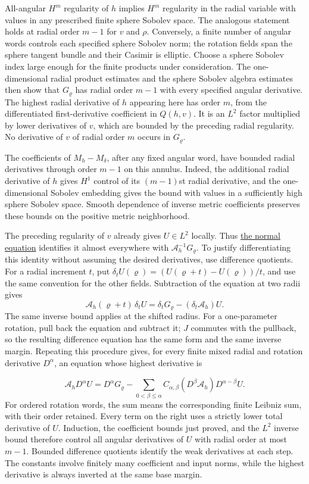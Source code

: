 \documentclass[
  english,
  11pt,
  reqno]{amsart}
\begin{document}
All-angular \(H^m\) regularity of \(h\) implies \(H^m\) regularity in
the radial variable with values in any prescribed finite sphere Sobolev
space. The analogous statement holds at radial order \(m-1\) for \(v\)
and \(\rho\). Conversely, a finite number of angular words controls each
specified sphere Sobolev norm; the rotation fields span the sphere
tangent bundle and their Casimir is elliptic. Choose a sphere Sobolev
index large enough for the finite products under consideration. The
one-dimensional radial product estimates and the sphere Sobolev algebra
estimates then show that \(G_\varrho\) has radial order \(m-1\) with
every specified angular derivative. The highest radial derivative of
\(h\) appearing here has order \(m\), from the differentiated
first-derivative coefficient in \(Q(h,v)\). It is an \(L^2\) factor
multiplied by lower derivatives of \(v\), which are bounded by the
preceding radial regularity. No derivative of \(v\) of radial order
\(m\) occurs in \(G_\varrho\).

The coefficients of \(M_h-M_\delta\), after any fixed angular word, have
bounded radial derivatives through order \(m-1\) on this annulus.
Indeed, the additional radial derivative of \(h\) gives \(H^1\) control
of its \((m-1)\)st radial derivative, and the one-dimensional Sobolev
embedding gives the bound with values in a sufficiently high sphere
Sobolev space. Smooth dependence of inverse metric coefficients
preserves these bounds on the positive metric neighborhood.

The preceding regularity of \(v\) already gives \(U\in L^2\) locally.
Thus \hyperref[eq:online-momentum-invertible-normal-equation]{the normal
equation} identifies it almost everywhere with
\(\mathcal A_h^{-1}G_\varrho\). To justify differentiating this identity
without assuming the desired derivatives, use difference quotients. For
a radial increment \(t\), put
\(\delta_tU(\varrho)=(U(\varrho+t)-U(\varrho))/t\), and use the same
convention for the other fields. Subtraction of the equation at two
radii gives \[
\mathcal A_h(\varrho+t)\,\delta_tU
 =\delta_tG_\varrho-(\delta_t\mathcal A_h)U.
\] The same inverse bound applies at the shifted radius. For a
one-parameter rotation, pull back the equation and subtract it; \(J\)
commutes with the pullback, so the resulting difference equation has the
same form and the same inverse margin. Repeating this procedure gives,
for every finite mixed radial and rotation derivative \(D^\alpha\), an
equation whose highest derivative is

\label{eq:online-momentum-differentiated-normal-equation}
\[
\mathcal A_hD^\alpha U
 =D^\alpha G_\varrho
  -\sum_{0<\beta\le\alpha}
     C_{\alpha,\beta}
       (D^\beta\mathcal A_h)D^{\alpha-\beta}U.
\] For ordered rotation words, the sum means the corresponding finite
Leibniz sum, with their order retained. Every term on the right uses a
strictly lower total derivative of \(U\). Induction, the coefficient
bounds just proved, and the \(L^2\) inverse bound therefore control all
angular derivatives of \(U\) with radial order at most \(m-1\). Bounded
difference quotients identify the weak derivatives at each step. The
constants involve finitely many coefficient and input norms, while the
highest derivative is always inverted at the same base margin.
\end{document}
